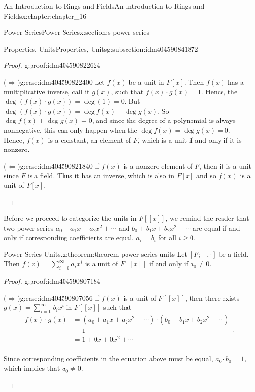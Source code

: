 \documentclass[twoside,10pt,]{book}
\newcommand{\forwardimplication}{($\Rightarrow$)}
\newcommand{\backwardimplication}{($\Leftarrow$)}
\numberwithin{equation}{section}
\begin{document}
\begin{chapterptx}{An Introduction to Rings and Fields}{}{An Introduction to Rings and Fields}{}{}{x:chapter:chapter_16}
\begin{sectionptx}{Power Series}{}{Power Series}{}{}{x:section:s-power-series}
\begin{subsectionptx}{Properties, Units}{}{Properties, Units}{}{}{g:subsection:idm404590841872}
\begin{proof}{}{g:proof:idm404590822624}
\begin{case}{\forwardimplication}{}{g:case:idm404590822400}
Let \(f(x)\) be a unit in \(F[x]\). Then \(f(x)\) has a multiplicative inverse, call it \(g(x)\), such that \(f(x) \cdot
g(x) = 1\). Hence, the \(\deg  (f(x)\cdot  g(x)) = \deg  (1) = 0\). But \(\deg  (f(x)\cdot  g(x)) = \deg  f(x) + \deg  g(x)\). So \(\deg  f(x) +
\deg  g(x) = 0\), and since the degree of a polynomial is always nonnegative, this can only happen when the \(\deg  f(x) = \deg  g(x) = 0\). Hence, \(f(x)\) is a constant, an element of \(F\), which is a unit if and only if it is nonzero.%
\end{case}
\begin{case}{\backwardimplication}{}{g:case:idm404590821840}
If \(f(x)\) is a nonzero element of \(F\), then it is a unit since \(F\) is a field.  Thus it has an inverse, which is also in \(F[x]\) and so \(f(x)\) is a unit of \(F[x]\).%
\end{case}
\end{proof}
Before we proceed to categorize the units in \(F[[x]]\), we remind the reader that two power series \(a_0 + a_1 x+a_2 x^2+ \cdots\) and \(b_0 + b_1
x+b_2 x^2+ \cdots\) are equal if and only if corresponding coefficients are equal, \(a_i=b_i\) for all \(i \geq 0\).%
\begin{theorem}{Power Series Units.}{}{x:theorem:theorem-power-series-units}%
%
%
Let \([F; +, \cdot ]\) be a field. Then \(f(x)=\sum_{i=0}^{\infty } a_i x^i\) is a unit of \(F[[x]]\)  if and only if \(a_0\neq
0\).%
\end{theorem}
\begin{proof}{}{g:proof:idm404590807184}
\begin{case}{\forwardimplication}{}{g:case:idm404590807056}
If \(f(x)\) is a unit of \(F[[x]]\), then there exists  \(g(x)=\sum_{i=0}^{\infty } b_i x^i\) in \(F[[x]]\) such that%
\begin{equation*}
\begin{split}
f(x)\cdot g(x) &=\left(a_0 + a_1 x+a_2 x^2+ \cdots \right)\cdot \left(b_0 + b_1 x+b_2 x^2+ \cdots \right)\\
& =1\\
& = 1 + 0x + 0x^2+ \cdots\\
\end{split}\text{.}
\end{equation*}
%
\par
Since corresponding coefficients in the equation above must be equal, \(a_0\cdot b_0=1\), which implies that \(a_0\neq 0\).%

\end{case}
\end{proof}
\end{subsectionptx}
\end{sectionptx}
\end{chapterptx}
\end{document}
